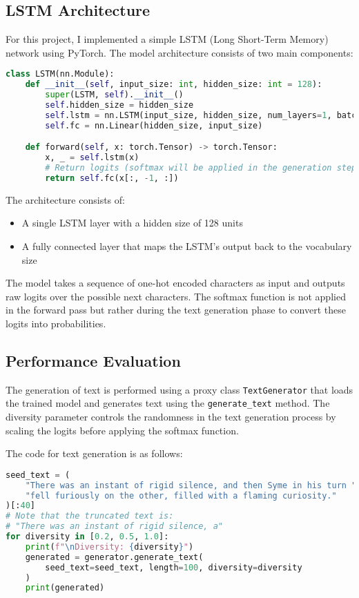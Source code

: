 \documentclass[12pt]{article}
\begin{document}
\subsection{LSTM Architecture}

For this project, I implemented a simple LSTM (Long Short-Term Memory) network using PyTorch. The model architecture consists of two main components:

\begin{lstlisting}[language=Python]
class LSTM(nn.Module):
    def __init__(self, input_size: int, hidden_size: int = 128):
        super(LSTM, self).__init__()
        self.hidden_size = hidden_size
        self.lstm = nn.LSTM(input_size, hidden_size, num_layers=1, batch_first=True)
        self.fc = nn.Linear(hidden_size, input_size)

    def forward(self, x: torch.Tensor) -> torch.Tensor:
        x, _ = self.lstm(x)
        # Return logits (softmax will be applied in the generation step)
        return self.fc(x[:, -1, :])
\end{lstlisting}

The architecture consists of:
\begin{itemize}
    \item A single LSTM layer with a hidden size of 128 units
    \item A fully connected layer that maps the LSTM's output back to the vocabulary size
\end{itemize}

The model takes a sequence of one-hot encoded characters as input and outputs raw logits over the possible next characters. The softmax function is not applied in the forward pass but rather during the text generation phase to convert these logits into probabilities.

\subsection{Performance Evaluation}

The generation of text is performed using a proxy class \texttt{TextGenerator} that loads the trained model and generates text using the \texttt{generate\_text} method. The diversity parameter controls the randomness in the text generation process by scaling the logits before applying the softmax function.

The code for text generation is as follows:

\begin{lstlisting}[language=Python]
seed_text = (
    "There was an instant of rigid silence, and then Syme in his turn "
    "fell furiously on the other, filled with a flaming curiosity."
)[:40]
# Note that the truncated text is:
# "There was an instant of rigid silence, a"
for diversity in [0.2, 0.5, 1.0]:
    print(f"\nDiversity: {diversity}")
    generated = generator.generate_text(
        seed_text=seed_text, length=100, diversity=diversity
    )
    print(generated)
\end{lstlisting}
\end{document}
